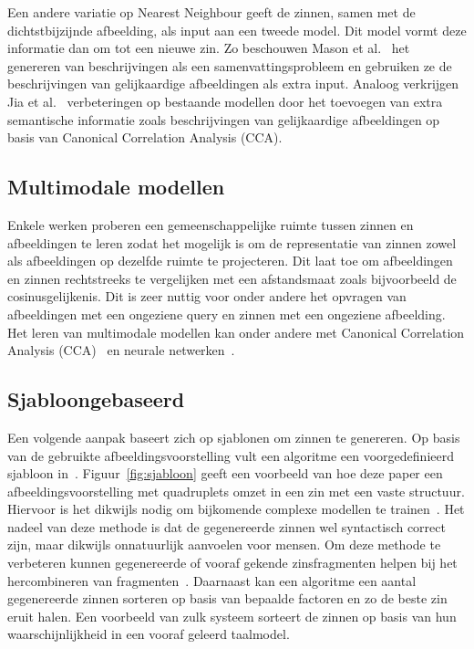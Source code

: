 Een andere variatie op Nearest Neighbour geeft de zinnen, samen met de dichtstbijzijnde afbeelding, als input aan een tweede model. Dit model vormt deze informatie dan om tot een nieuwe zin. Zo beschouwen Mason et al.~\cite{Mason2014} het genereren van beschrijvingen als een samenvattingsprobleem en gebruiken ze de beschrijvingen van gelijkaardige afbeeldingen als extra input. Analoog verkrijgen Jia et al.~\cite{Fernando2015} verbeteringen op bestaande modellen door het toevoegen van extra semantische informatie zoals beschrijvingen van gelijkaardige afbeeldingen op basis van Canonical Correlation Analysis (CCA).
 
\subsection{Multimodale modellen}
Enkele werken proberen een gemeenschappelijke ruimte tussen zinnen en afbeeldingen te leren zodat het mogelijk is om de representatie van zinnen zowel als afbeeldingen op dezelfde ruimte te projecteren. Dit laat toe om afbeeldingen en zinnen rechtstreeks te vergelijken met een afstandsmaat zoals bijvoorbeeld de cosinusgelijkenis. Dit is zeer nuttig voor onder andere het opvragen van afbeeldingen met een ongeziene query en zinnen met een ongeziene afbeelding. Het leren van multimodale modellen kan onder andere met Canonical Correlation Analysis (CCA)~\cite{Hodosh2013} en neurale netwerken~\cite{Mao2014,Karpathy2014,Kiros2013}. 

\subsection{Sjabloongebaseerd}
Een volgende aanpak baseert zich op sjablonen om zinnen te genereren. Op basis van de gebruikte afbeeldingsvoorstelling vult een algoritme een voorgedefinieerd sjabloon in~\cite{Yang2011}. Figuur~\ref{fig:sjabloon} geeft een voorbeeld van hoe deze paper een afbeeldingsvoorstelling met quadruplets omzet in een zin met een vaste structuur. Hiervoor is het dikwijls nodig om bijkomende complexe modellen te trainen~\cite{Elliott2013}. Het nadeel van deze methode is dat de gegenereerde zinnen wel syntactisch correct zijn, maar dikwijls onnatuurlijk aanvoelen voor mensen. Om deze methode te verbeteren kunnen gegenereerde of vooraf gekende zinsfragmenten helpen bij het hercombineren van fragmenten~\cite{Mitchell2012,Kuznetsova2012}. Daarnaast kan een algoritme een aantal gegenereerde zinnen sorteren op basis van bepaalde factoren en zo de beste zin eruit halen. Een voorbeeld van zulk systeem sorteert de zinnen op basis van hun waarschijnlijkheid in een vooraf geleerd taalmodel.

